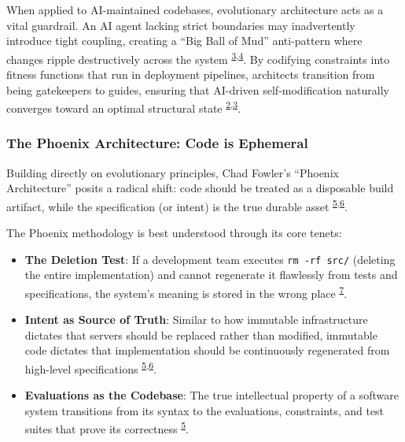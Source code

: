 \documentclass[
  11pt,
]{article}
\providecommand{\tightlist}{%
  \setlength{\itemsep}{0pt}\setlength{\parskip}{0pt}}
\begin{document}
When applied to AI-maintained codebases, evolutionary architecture acts
as a vital guardrail. An AI agent lacking strict boundaries may
inadvertently introduce tight coupling, creating a ``Big Ball of Mud''
anti-pattern where changes ripple destructively across the system
\textsuperscript{\protect\hyperlink{cite-3}{3},\protect\hyperlink{cite-4}{4}}.
By codifying constraints into fitness functions that run in deployment
pipelines, architects transition from being gatekeepers to guides,
ensuring that AI-driven self-modification naturally converges toward an
optimal structural state
\textsuperscript{\protect\hyperlink{cite-2}{2},\protect\hyperlink{cite-3}{3}}.

\hypertarget{the-phoenix-architecture-code-is-ephemeral}{%
\subsubsection{The Phoenix Architecture: Code is
Ephemeral}\label{the-phoenix-architecture-code-is-ephemeral}}

Building directly on evolutionary principles, Chad Fowler's ``Phoenix
Architecture'' posits a radical shift: code should be treated as a
disposable build artifact, while the specification (or intent) is the
true durable asset
\textsuperscript{\protect\hyperlink{cite-5}{5},\protect\hyperlink{cite-6}{6}}.

The Phoenix methodology is best understood through its core tenets:

\begin{itemize}
\tightlist
\item
  \textbf{The Deletion Test}: If a development team executes
  \texttt{rm\ -rf\ src/} (deleting the entire implementation) and cannot
  regenerate it flawlessly from tests and specifications, the system's
  meaning is stored in the wrong place
  \textsuperscript{\protect\hyperlink{cite-7}{7}}.
\item
  \textbf{Intent as Source of Truth}: Similar to how immutable
  infrastructure dictates that servers should be replaced rather than
  modified, immutable code dictates that implementation should be
  continuously regenerated from high-level specifications
  \textsuperscript{\protect\hyperlink{cite-5}{5},\protect\hyperlink{cite-6}{6}}.
\item
  \textbf{Evaluations as the Codebase}: The true intellectual property
  of a software system transitions from its syntax to the evaluations,
  constraints, and test suites that prove its correctness
  \textsuperscript{\protect\hyperlink{cite-5}{5}}.
\end{itemize}
\end{document}
